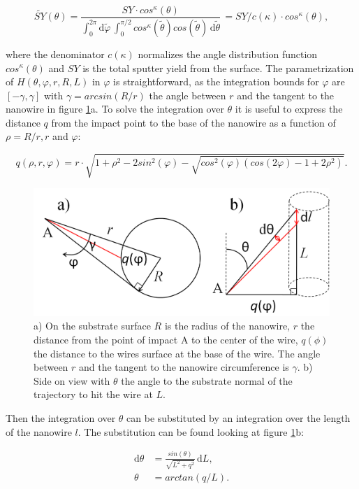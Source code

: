 \begin{equation}
\tilde{SY}(\theta) = \frac{SY \cdot cos^\kappa(\theta)}{\int_0^{2\pi} \! \mathrm{d}\tilde\varphi \,\int_0^{\pi/2} \! cos^\kappa(\tilde\theta) cos(\tilde\theta)\,  \mathrm{d}\tilde\theta} \, = SY /c(\kappa) \cdot cos^\kappa(\theta) ,
\end{equation}

where the denominator $c(\kappa)$ normalizes the angle distribution function $cos^\kappa(\theta)$ and $SY$ is the total sputter yield from the surface. The parametrization of $H(\theta,\varphi,r,R,L)$ in $\varphi$ is straightforward, as the integration bounds for $\varphi$ are $[-\gamma, \gamma]$ with $\gamma = arcsin(R/r)$ the angle between $r$ and the tangent to the nanowire in figure \ref{anglesredepo}a. To solve the integration over $\theta$ it is useful to express the distance $q$ from the impact point to the base of the nanowire as a function of $\rho = R/r, r$ and $\varphi$:

\begin{equation}
q(\rho,r,\varphi) = r\cdot \sqrt{1 + \rho^2 - 2sin^2(\varphi) - \sqrt{cos^2(\varphi)(cos(2\varphi) - 1 + 2\rho^2)}}.
\end{equation}

\begin{figure}
	\centering
		\includegraphics[width=.6\textwidth]{images/anglesredeposition.jpg}
	\caption{a) On the substrate surface $R$ is the radius of the nanowire, $r$ the distance from the point of impact A to the center of the wire, $q(\phi)$ the distance to the wires surface at the base of the wire. The angle between $r$ and the tangent to the nanowire circumference is $\gamma$. b) Side on view with $\theta$ the angle to the substrate normal of the trajectory to hit the wire at $L$.} 
	\label{anglesredepo}
\end{figure} 

Then the integration over $\theta$ can be substituted by an integration over the length of the nanowire $l$. The substitution can be found looking at figure \ref{anglesredepo}b:

\begin{align*}
\mathrm{d}\theta &= \frac{sin(\theta)}{\sqrt{L^2 + q^2}}\,\mathrm{d}L,\\
\theta &= arctan(q/L).
\end{align*}


